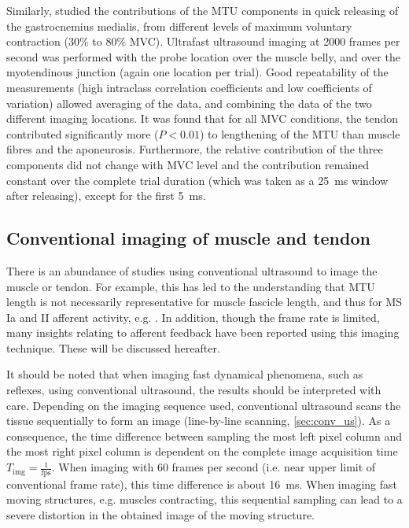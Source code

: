 Similarly, \citet{farcy_interaction_2014} studied the contributions of the MTU components in quick releasing of the gastrocnemius medialis, from different levels of maximum voluntary contraction (30\% to 80\% MVC). Ultrafast ultrasound imaging at 2000 frames per second was performed with the probe location over the muscle belly, and over the myotendinous junction (again one location per trial). Good repeatability of the measurements (high intraclass correlation coefficients and low coefficients of variation) allowed averaging of the data, and combining the data of the two different imaging locations. It was found that for all MVC conditions, the tendon contributed significantly more ($P<0.01$) to lengthening of the MTU than muscle fibres and the aponeurosis. 
Furthermore, the relative contribution of the three components did not change with MVC level and the contribution remained constant over the complete trial duration (which was taken as a \SI{25}{\milli\second} window after releasing), except for the first \SI{5}{\milli\second}. 






\subsection{Conventional imaging of muscle and tendon}
There is an abundance of studies using conventional ultrasound to image the muscle or tendon. For example, this has led to the understanding that MTU length is not necessarily representative for muscle fascicle length, and thus for MS Ia and II afferent activity, e.g. \cite{maas_is_2009, cronin_automatic_2011}. In addition, though the frame rate is limited, many insights relating to afferent feedback have been reported using this imaging technique. These will be discussed hereafter. 

It should be noted that when imaging fast dynamical phenomena, such as reflexes, using conventional ultrasound, the results should be interpreted with care. Depending on the imaging sequence used, conventional ultrasound scans the tissue sequentially to form an image (line-by-line scanning, \autoref{sec:conv_us}). As a consequence, the time difference between sampling the most left pixel column and the most right pixel column is dependent on the complete image acquisition time $T_\text{img} = \frac{1}{\text{fps}}$. When imaging with 60 frames per second (i.e. near upper limit of conventional frame rate), this time difference is about \SI{16}{\milli\second}. When imaging fast moving structures, e.g. muscles contracting, this sequential sampling can lead to a severe distortion in the obtained image of the moving structure.  



